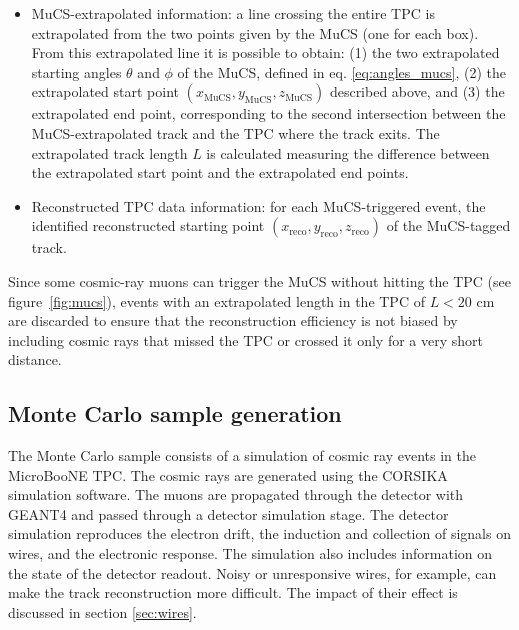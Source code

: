 \documentclass[a4paper,11pt]{article}
\begin{document}
\begin{itemize}
  \item MuCS-extrapolated information: a line crossing the entire TPC is extrapolated from the two points given by the MuCS (one for each box). From this extrapolated line it is possible to obtain: (1) the two extrapolated starting angles $\theta$ and $\phi$ of the MuCS, defined in eq. \eqref{eq:angles_mucs}, (2) the extrapolated start point $(x_{\mathrm{MuCS}},y_{\mathrm{MuCS}},z_{\mathrm{MuCS}})$ described above, and (3) the extrapolated end point, corresponding to the second intersection between the MuCS-extrapolated track and the TPC where the track exits. The extrapolated track length $L$ is calculated measuring the difference between the extrapolated start point and the extrapolated end points.
  \item Reconstructed TPC data information: for each MuCS-triggered event, the identified reconstructed starting point $(x_{\mathrm{reco}},y_{\mathrm{reco}},z_{\mathrm{reco}})$ of the MuCS-tagged track.
\end{itemize}

Since some cosmic-ray muons can trigger the MuCS without hitting the TPC (see figure~\ref{fig:mucs}), events with an extrapolated length in the TPC of $L < 20$ cm are discarded to ensure that the reconstruction efficiency is not biased by including cosmic rays that missed the TPC or crossed it only for a very short distance.

\subsection{Monte Carlo sample generation}\label{sec:mcgen}

The Monte Carlo sample consists of a simulation of cosmic ray events in the MicroBooNE TPC. The cosmic rays are generated using the CORSIKA \cite{corsika} simulation software. The muons are propagated through the detector with GEANT4 \cite{geant} and passed through a detector simulation stage. The detector simulation reproduces the electron drift, the induction and collection of signals on wires, and the electronic response. The simulation also includes information on the state of the detector readout. Noisy or unresponsive wires, for example, can make the track reconstruction more difficult. The impact of their effect is discussed in section \ref{sec:wires}.

\end{document}
